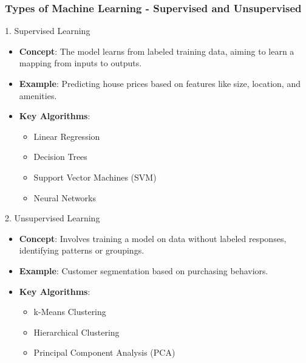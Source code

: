\documentclass[aspectratio=169]{beamer}
\begin{document}
\begin{frame}[fragile]
    \frametitle{Types of Machine Learning - Supervised and Unsupervised}
    \begin{block}{1. Supervised Learning}
        \begin{itemize}
            \item \textbf{Concept}: The model learns from labeled training data, aiming to learn a mapping from inputs to outputs.
            \item \textbf{Example}: Predicting house prices based on features like size, location, and amenities.
            \item \textbf{Key Algorithms}:
            \begin{itemize}
                \item Linear Regression
                \item Decision Trees
                \item Support Vector Machines (SVM)
                \item Neural Networks
            \end{itemize}
        \end{itemize}
    \end{block}
    
    \begin{block}{2. Unsupervised Learning}
        \begin{itemize}
            \item \textbf{Concept}: Involves training a model on data without labeled responses, identifying patterns or groupings.
            \item \textbf{Example}: Customer segmentation based on purchasing behaviors.
            \item \textbf{Key Algorithms}:
            \begin{itemize}
                \item k-Means Clustering
                \item Hierarchical Clustering
                \item Principal Component Analysis (PCA)
            \end{itemize}
        \end{itemize}
    \end{block}
\end{frame}
\end{document}
